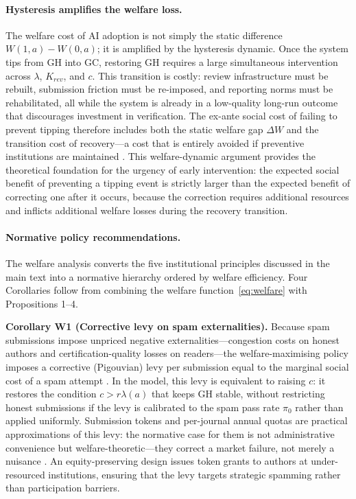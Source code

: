 \documentclass{article}
\begin{document}
\paragraph{Hysteresis amplifies the welfare loss.}
The welfare cost of AI adoption is not simply the static difference $W(1,a) - W(0,a)$; it is amplified by the hysteresis dynamic.
Once the system tips from GH into GC, restoring GH requires a large simultaneous intervention across $\lambda$, $K_{rev}$, and $c$.
This transition is costly: review infrastructure must be rebuilt, submission friction must be re-imposed, and reporting norms must be rehabilitated, all while the system is already in a low-quality long-run outcome that discourages investment in verification.
The ex-ante social cost of failing to prevent tipping therefore includes both the static welfare gap $\Delta W$ and the transition cost of recovery---a cost that is entirely avoided if preventive institutions are maintained \citep{Scheffer2001}.
This welfare-dynamic argument provides the theoretical foundation for the urgency of early intervention: the expected social benefit of preventing a tipping event is strictly larger than the expected benefit of correcting one after it occurs, because the correction requires additional resources and inflicts additional welfare losses during the recovery transition.

\paragraph{Normative policy recommendations.}
The welfare analysis converts the five institutional principles discussed in the main text into a normative hierarchy ordered by welfare efficiency.
Four Corollaries follow from combining the welfare function~\eqref{eq:welfare} with Propositions 1--4.

\medskip
\noindent\textbf{Corollary W1 (Corrective levy on spam externalities).}
Because spam submissions impose unpriced negative externalities---congestion costs on honest authors and certification-quality losses on readers---the welfare-maximising policy imposes a corrective (Pigouvian) levy per submission equal to the marginal social cost of a spam attempt \citep{Pigou1920}.
In the model, this levy is equivalent to raising $c$: it restores the condition $c > r\lambda(a)$ that keeps GH stable, without restricting honest submissions if the levy is calibrated to the spam pass rate $\pi_0$ rather than applied uniformly.
Submission tokens and per-journal annual quotas are practical approximations of this levy: the normative case for them is not administrative convenience but welfare-theoretic---they correct a market failure, not merely a nuisance \citep{Cotton2013}.
An equity-preserving design issues token grants to authors at under-resourced institutions, ensuring that the levy targets strategic spamming rather than participation barriers.
\end{document}
